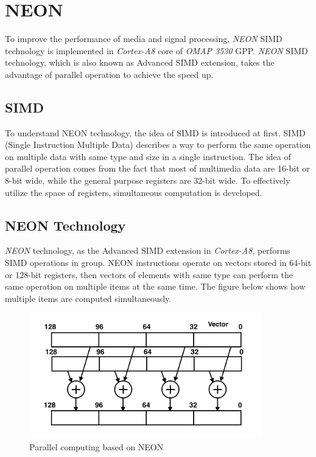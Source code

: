 \section{NEON}
To improve the performance of media and signal processing, 
\emph{NEON} SIMD technology is implemented in \emph{Cortex-A8} core of \emph{OMAP 3530} GPP. 
\emph{NEON} SIMD technology, which is also known as Advanced SIMD extension, 
takes the advantage of parallel operation to achieve the speed up.
\subsection{SIMD}
To understand NEON technology, the idea of SIMD is introduced at first. 
SIMD (Single Instruction Multiple Data) describes a way to perform the same operation on multiple data with same type and size in a single instruction. 
The idea of parallel operation comes from the fact that most of multimedia data are 16-bit or 8-bit wide, while the general purpose registers are 32-bit wide. 
To effectively utilize the space of registers, simultaneous computation is developed.  
\subsection{NEON Technology} 
\emph{NEON} technology, as the Advanced SIMD extension in \emph{Cortex-A8}, performs SIMD operations in group. 
NEON instructions operate on vectors stored in 64-bit or 128-bit registers, 
then vectors of elements with same type can perform the same operation on multiple items at the same time.
The figure below shows how multiple items are computed simultaneously. 

\begin{figure}[h]
\centering
\includegraphics[width=0.9\textwidth]{images/neon}
\caption{Parallel computing based on NEON}
\label{fig:neon}
\end{figure}

